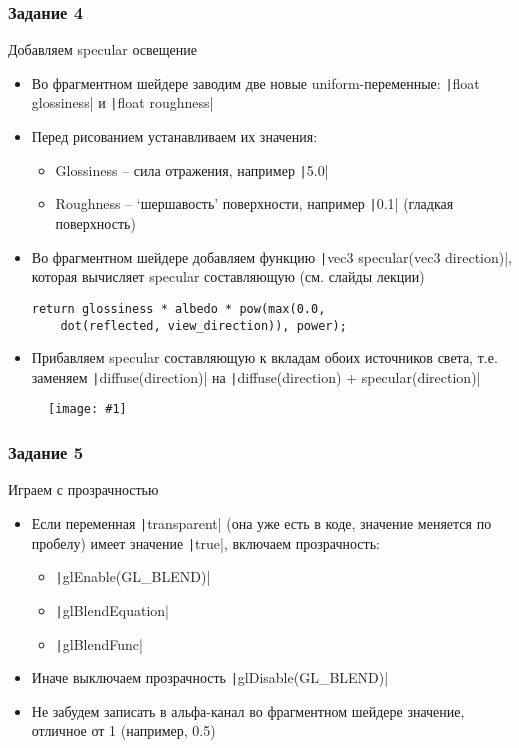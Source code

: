 \documentclass[10pt]{beamer}
\newcommand{\slideimage}[1]{
  \begin{figure}
    \begin{adjustbox}{width=\textwidth, totalheight=\textheight-2\baselineskip-2\baselineskip,keepaspectratio}
      \texttt{[image: \#1]}
    \end{adjustbox}
  \end{figure}
}
\begin{document}
\begin{frame}[fragile]
\frametitle{Задание 4}
Добавляем specular освещение
\begin{itemize}
\item Во фрагментном шейдере заводим две новые uniform-переменные: \texttt|float glossiness| и \texttt|float roughness|
\item Перед рисованием устанавливаем их значения:
\begin{itemize}
\item Glossiness -- сила отражения, например \texttt|5.0|
\item Roughness -- `шершавость' поверхности, например \texttt|0.1| (гладкая поверхность)
\end{itemize}
\item Во фрагментном шейдере добавляем функцию \texttt|vec3 specular(vec3 direction)|, которая вычисляет specular составляющую (см. слайды лекции)
\begin{verbatim}
return glossiness * albedo * pow(max(0.0,
    dot(reflected, view_direction)), power);
\end{verbatim}
\item Прибавляем specular составляющую к вкладам обоих источников света, т.е. заменяем \texttt|diffuse(direction)| на \texttt|diffuse(direction) + specular(direction)|
\end{itemize}
\end{frame}

\begin{frame}[fragile]
\slideimage{4.png}
\end{frame}

\begin{frame}[fragile]
\frametitle{Задание 5}
Играем с прозрачностью
\begin{itemize}
\item Если переменная \texttt|transparent| (она уже есть в коде, значение меняется по пробелу) имеет значение \texttt|true|, включаем прозрачность:
\begin{itemize}
\item \texttt|glEnable(GL_BLEND)|
\item \texttt|glBlendEquation|
\item \texttt|glBlendFunc|
\end{itemize}
\item Иначе выключаем прозрачность \texttt|glDisable(GL_BLEND)|
\item Не забудем записать в альфа-канал во фрагментном шейдере значение, отличное от 1 (например, 0.5)
\end{itemize}
\end{frame}
\end{document}
